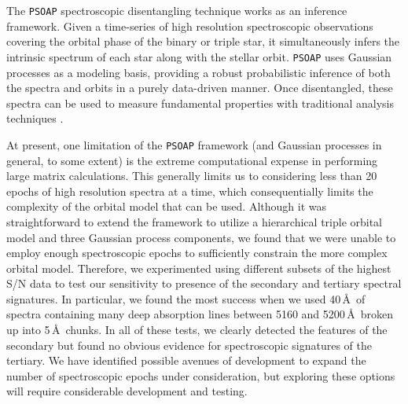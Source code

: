 \documentclass[twocolumn]{aastex61}
\begin{document}
The \texttt{PSOAP} spectroscopic disentangling technique works as an inference framework. Given a time-series of high resolution spectroscopic observations covering the orbital phase of the binary or triple star, it simultaneously infers the intrinsic spectrum of each star along with the stellar orbit. \texttt{PSOAP} uses Gaussian processes as a modeling basis, providing a robust probabilistic inference of both the spectra and orbits in a purely data-driven manner. Once disentangled, these spectra can be used to measure fundamental properties with traditional analysis techniques \citep{czekala17}.

At present, one limitation of the \texttt{PSOAP} framework (and Gaussian processes in general, to some extent) is the extreme computational expense in performing large matrix calculations. This generally limits us to considering less than 20 epochs of high resolution spectra at a time, which consequentially limits the complexity of the orbital model that can be used. Although it was straightforward to extend the framework to utilize a hierarchical triple orbital model and three Gaussian process components, we found that we were unable to employ enough spectroscopic epochs to sufficiently constrain the more complex orbital model. Therefore, we experimented using different subsets of the highest S/N data to test our sensitivity to presence of the secondary and tertiary spectral signatures. In particular, we found the most success when we used 40\,\AA\ of spectra containing many deep absorption lines between 5160 and 5200\,\AA\ broken up into 5\,\AA\ chunks. In all of these tests, we clearly detected the features of the secondary but found no obvious evidence for spectroscopic signatures of the tertiary. We have identified possible avenues of development to expand the number of spectroscopic epochs under consideration, but exploring these options will require considerable development and testing.
\end{document}
